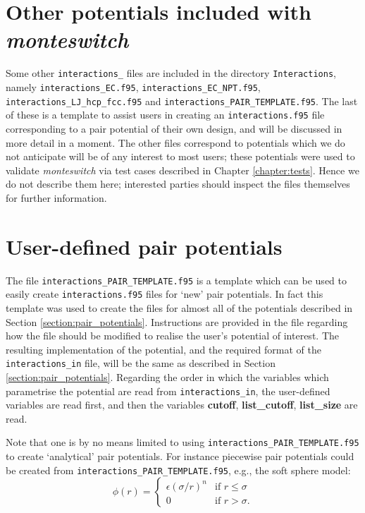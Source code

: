 \documentclass{report}
\begin{document}
\section{Other potentials included with \emph{monteswitch}}
Some other \texttt{interactions\_} files are included in the directory \texttt{Interactions}, namely \texttt{interactions\_EC.f95}, 
\texttt{interactions\_EC\_NPT.f95}, \texttt{interactions\_LJ\_hcp\_fcc.f95} and \texttt{interactions\_PAIR\_TEMPLATE.f95}. The last of
these is a template to assist users in creating an \texttt{interactions.f95} file corresponding to a pair potential of their own
design, and will be discussed in more detail in a moment. The other files correspond to potentials which we do not anticipate will
be of any interest to most users; these potentials were used to validate \emph{monteswitch} via test cases described in Chapter
\ref{chapter:tests}. Hence we do not describe them here; interested parties should inspect the files themselves for further information.


\section{User-defined pair potentials}\label{sec:user_defined}
The file \texttt{interactions\_PAIR\_TEMPLATE.f95} is a template which can be used to easily create \texttt{interactions.f95} files for `new'
pair potentials. In fact this template was used to create the files for almost all of the potentials described in Section
\ref{section:pair_potentials}. Instructions are provided in the file regarding how the file should be modified to realise the user's potential
of interest. The resulting implementation of the potential, and the required format of the \texttt{interactions\_in} file, will be the same as described 
in Section \ref{section:pair_potentials}. Regarding the order in which the variables which parametrise the potential are read from 
\texttt{interactions\_in}, the user-defined variables are read first, and then the variables \textbf{cutoff}, \textbf{list\_cutoff}, 
\textbf{list\_size} are read.

Note that one is by no means limited to using \texttt{interactions\_PAIR\_TEMPLATE.f95} to create `analytical' pair potentials. For instance
piecewise pair potentials could be created from \texttt{interactions\_PAIR\_TEMPLATE.f95}, e.g., the soft sphere model:
\begin{equation}
\phi(r)=
\begin{cases} 
\epsilon(\sigma/r)^n & \text{if }r\leq\sigma \\
0 & \text{if }r>\sigma.
\end{cases}
\end{equation}
\end{document}
